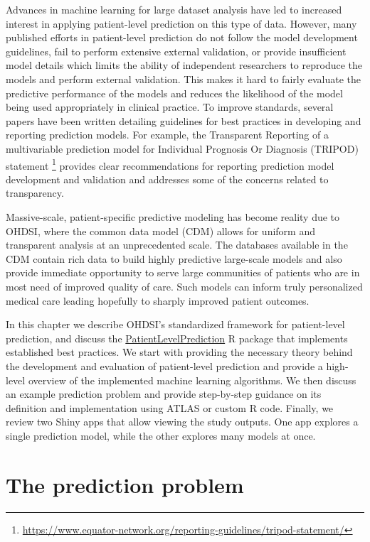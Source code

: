 \documentclass[11pt]{book}
\let\rmarkdownfootnote\footnote%
\def\footnote{\protect\rmarkdownfootnote}
\theoremstyle{definition}
\theoremstyle{definition}
\theoremstyle{definition}
\theoremstyle{remark}
\begin{document}
Advances in machine learning for large dataset analysis have led to increased interest in applying patient-level prediction on this type of data. However, many published efforts in patient-level prediction do not follow the model development guidelines, fail to perform extensive external validation, or provide insufficient model details which limits the ability of independent researchers to reproduce the models and perform external validation. This makes it hard to fairly evaluate the predictive performance of the models and reduces the likelihood of the model being used appropriately in clinical practice. To improve standards, several papers have been written detailing guidelines for best practices in developing and reporting prediction models. For example, the Transparent Reporting of a multivariable prediction model for Individual Prognosis Or Diagnosis (TRIPOD) statement \footnote{\url{https://www.equator-network.org/reporting-guidelines/tripod-statement/}} provides clear recommendations for reporting prediction model development and validation and addresses some of the concerns related to transparency.  

Massive-scale, patient-specific predictive modeling has become reality due to OHDSI, where the common data model (CDM) allows for uniform and transparent analysis at an unprecedented scale. The databases available in the CDM contain rich data to build highly predictive large-scale models and also provide immediate opportunity to serve large communities of patients who are in most need of improved quality of care. Such models can inform truly personalized medical care leading hopefully to sharply improved patient outcomes.

In this chapter we describe OHDSI's standardized framework for patient-level prediction, \citep{reps2018} and discuss the \href{https://ohdsi.github.io/PatientLevelPrediction/}{PatientLevelPrediction} R package that implements established best practices. We start with providing the necessary theory behind the development and evaluation of patient-level prediction and provide a high-level overview of the implemented machine learning algorithms. We then discuss an example prediction problem and provide step-by-step guidance on its definition and implementation using ATLAS or custom R code. Finally, we review two Shiny apps that allow viewing the study outputs. One app explores a single prediction model, while the other explores many models at once.

\hypertarget{the-prediction-problem}{%
\section{The prediction problem}\label{the-prediction-problem}}
\end{document}
